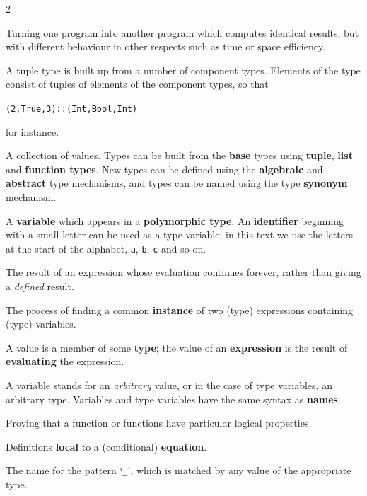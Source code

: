 \begin{multicols}{2}
{
Turning one program into another program which computes identical results,
but with different behaviour in other respects such as time or space
efficiency.

A tuple type is built up from a number of component types. Elements of the
type consist of tuples of elements of the component types, so that
\begin{alltt}
(2,True,3) :: (Int,Bool,Int)
\end{alltt}
for instance.

A collection of values. Types can be built from the \textbf{base} types
using \textbf{tuple}, \textbf{list} and \textbf{function types}. New types can be
defined using the \textbf{algebraic} and \textbf{abstract} type mechanisms, and
types can be named using the type \textbf{synonym} mechanism.

A \textbf{variable}
which appears in a \textbf{polymorphic type}. An \textbf{identifier} beginning with a
small letter can be used as a type variable; in this text we use the
letters at the
start of the alphabet,
\texttt{a}, \texttt{b}, \texttt{c} and so on.

The result of an expression whose evaluation continues forever, rather than
giving a {\em defined\/} result.

The process of finding a common \textbf{instance} of two (type) expressions
containing (type) variables.

A value is a member of some \textbf{type}; the value of an \textbf{expression} is the
result of \textbf{evaluating} the expression.

A variable stands for an {\em arbitrary\/} value, or in the case of type
variables, an arbitrary type. Variables and type variables
have the same syntax as \textbf{names}.

Proving that a function or functions have particular logical properties.

Definitions \textbf{local} to a (conditional) \textbf{equation}.

The name for the pattern `\texttt{\_}', which is matched by any value of the
appropriate type.

} %

\end{multicols}


%
